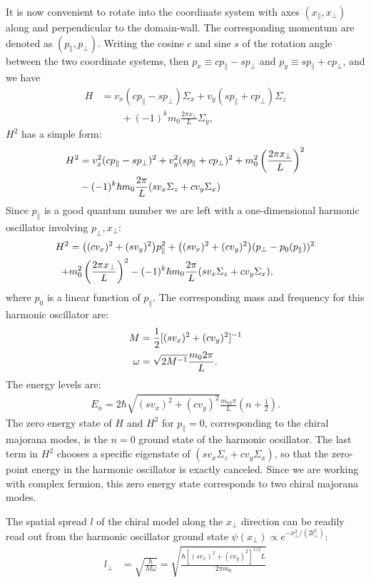 \begin{subappendices}
	It is now convenient to rotate into the coordinate system with axes $(x_\parallel,x_\perp)$ along and perpendicular to the domain-wall. The corresponding momentum are denoted as $(p_\parallel,p_\perp)$. Writing the cosine $c$ and sine $s$ of the rotation angle between the two coordinate systems, then $p_x\equiv c p_\parallel- s p_\perp$ and $p_y\equiv s p_\parallel+c p_\perp$, and we have
	\begin{align}
		H&=v_x (c p_\parallel- s p_\perp)\Sigma_x+v_y (s p_\parallel+c p_\perp)\Sigma_z\nonumber\\
		&\qquad+(-1)^k m_0\frac{2\pi x_\perp}{L}\Sigma_y,
	\end{align}
	$H^2$ has a simple form:
	\begin{align}
		H^2&=v_x^2(c p_\parallel- s p_\perp)^2+v_y^2(s p_\parallel+c p_\perp)^2+m_0^2\left(\frac{2\pi x_\perp}{L}\right)^2\notag\\
		&-(-1)^k \hbar m_0\frac{2\pi}{L}(sv_x\Sigma_z+c v_y\Sigma_x)
	\end{align}
	Since $p_\parallel$ is a good quantum number we are left with a one-dimensional harmonic oscillator involving $p_\perp,x_\perp$:
	\begin{align}
		H^2&=\big((cv_x)^2+(sv_y)^2\big)p_\parallel^2+\big((sv_x)^2+(cv_y)^2\big)(p_\perp - p_0(p_\parallel) )^2\notag\\
		+&m_0^2\left(\frac{2\pi x_\perp}{L}\right)^2-(-1)^k \hbar m_0\frac{2\pi}{L}(sv_x\Sigma_z+c v_y\Sigma_x),
	\end{align}
	where $p_0$ is a linear function of $p_\parallel$. The corresponding mass and frequency for this harmonic oscillator are:
	\begin{align}
		M&=\frac{1}{2}[(sv_x)^2+(cv_y)^2]^{-1}\notag\\
		\omega&=\sqrt{2M^{-1}}\frac{m_02\pi}{L}.
	\end{align}
	The energy levels are:
	\begin{align}
		E_n=2\hbar\sqrt{(sv_x)^2+(cv_y)^2}\frac{m_02\pi}{L}(n+\frac{1}{2}).
	\end{align}
	The zero energy state of $H$ and $H^2$ for $p_\parallel=0$, corresponding to the chiral majorana modes, is the $n=0$ ground state of the harmonic ocsillator. The last term in $H^2$ chooses a specific eigenstate of $(sv_x\Sigma_z+c v_y\Sigma_x)$, so that the zero-point energy in the harmonic oscillator is exactly canceled. Since we are working with complex fermion, this zero energy state corresponds to two chiral majorana modes.

	The spatial spread $l$ of the chiral model along the $x_\perp$ direction can be readily read out from the harmonic oscillator ground state $\psi(x_\perp)\propto e^{-x_\perp^2/(2l_\perp^2)}$:
	\begin{align}
		l_\perp&=\sqrt{\frac{\hbar}{M\omega}}=\sqrt{\frac{\hbar [(sv_x)^2+(cv_y)^2]^{1/2} L}{2\pi m_0}}
	\end{align}
	

\end{subappendices}
